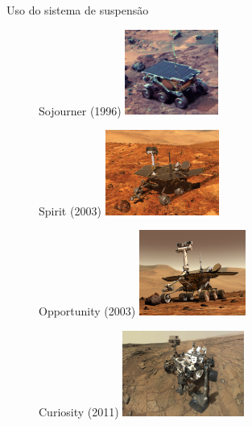 \documentclass[11pt]{beamer}
\begin{document}
\begin{frame}{Uso do sistema de suspensão}
  \begin{figure}[ht]
    \begin{minipage}[b]{.32\textwidth}
      \centering
      Sojourner (1996)
      \includegraphics[width=.9\textwidth,height=2.8cm]{fig/sojourner.jpg}
    \end{minipage}%
    \begin{minipage}[b]{.32\textwidth}
      \centering
      Spirit (2003)
      \includegraphics[width=.9\textwidth,height=2.8cm]{fig/spirit.jpg}
    \end{minipage}%
    \begin{minipage}[b]{.32\textwidth}
      \centering
      Opportunity (2003)
      \includegraphics[width=.9\textwidth,height=2.8cm]{fig/opportunity.jpg}
    \end{minipage}
  \end{figure}
  \vspace{-4mm}
  \begin{figure}[ht]
    \begin{minipage}[b]{.32\textwidth}
      \centering
      Curiosity (2011)
      \includegraphics[width=.9\textwidth,height=2.8cm,trim={11cm 0 6.5cm 0},clip]{fig/curiosity.jpg}

\end{minipage}
\end{figure}
\end{frame}
\end{document}
